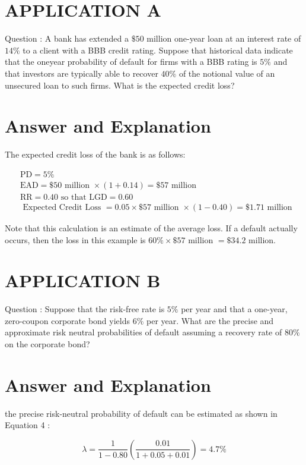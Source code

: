 \documentclass[11pt]{article}
\begin{document}
\section*{APPLICATION A}
Question : A bank has extended a $\$ 50$ million one-year loan at an interest rate of $14 \%$ to a client with a BBB credit rating. Suppose that historical data indicate that the oneyear probability of default for firms with a BBB rating is $5 \%$ and that investors are typically able to recover $40 \%$ of the notional value of an unsecured loan to such firms. What is the expected credit loss?

\section*{Answer and Explanation}
The expected credit loss of the bank is as follows:

$$
\begin{aligned}
& \mathrm{PD}=5 \% \\
& \mathrm{EAD}=\$ 50 \text { million } \times(1+0.14)=\$ 57 \text { million } \\
& \mathrm{RR}=0.40 \text { so that } \mathrm{LGD}=0.60 \\
& \text { Expected Credit Loss }=0.05 \times \$ 57 \text { million } \times(1-0.40)=\$ 1.71 \text { million }
\end{aligned}
$$

Note that this calculation is an estimate of the average loss. If a default actually occurs, then the loss in this example is $60 \% \times \$ 57$ million $=\$ 34.2$ million.

\section*{APPLICATION B}
Question : Suppose that the risk-free rate is $5 \%$ per year and that a one-year, zero-coupon corporate bond yields $6 \%$ per year. What are the precise and approximate risk neutral probabilities of default assuming a recovery rate of $80 \%$ on the corporate bond?

\section*{Answer and Explanation}
the precise risk-neutral probability of default can be estimated as shown in Equation 4 :

$$
\lambda=\frac{1}{1-0.80}\left(\frac{0.01}{1+0.05+0.01}\right)=4.7 \%
$$
\end{document}
